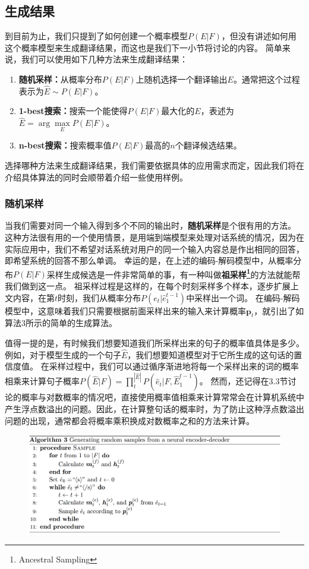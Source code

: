 \documentclass[10pt,a4paper]{ctexart}
\begin{document}
\subsection{生成结果}
到目前为止，我们只提到了如何创建一个概率模型$P(E|F)$，但没有讲述如何用这个概率模型来生成翻译结果，而这也是我们下一小节将讨论的内容。
简单来说，我们可以使用如下几种方法来生成翻译结果：
\begin{enumerate}
\item[] \textbf{随机采样：}从概率分布$P(E|F)$上随机选择一个翻译输出$E$。通常把这个过程表示为$\hat{E} \sim P(E|F)$。
\item[] \textbf{1-best搜索：}搜索一个能使得$P(E|F)$最大化的$E$，表述为$\hat{E} = \arg\max \limits_{E} P(E|F)$。
\item[] \textbf{n-best搜索：}搜索概率值$P(E|F)$最高的$n$个翻译候选结果。
\end{enumerate}
选择哪种方法来生成翻译结果，我们需要依据具体的应用需求而定，因此我们将在介绍具体算法的同时会顺带着介绍一些使用样例。

\subsubsection{随机采样}
当我们需要对同一个输入得到多个不同的输出时，\textbf{随机采样}是个很有用的方法。
这种方法很有用的一个使用情景，是用端到端模型来处理对话系统的情况，因为在实际应用中，我们不希望对话系统对用户的同一个输入内容总是作出相同的回答，即希望系统的回答不那么单调。
幸运的是，在上述的编码-解码模型中，从概率分布$P(E|F)$采样生成候选是一件非常简单的事，有一种叫做\textbf{祖采样\footnote{Ancestral Sampling}}的方法就能帮我们做到这一点。
祖采样过程是这样的，在每个时刻采样多个样本，逐步扩展上文内容，在第$t$时刻，我们从概率分布$P(e_t | \hat{e}_1^{t-1})$中采样出一个词。
在编码-解码模型中，这意味着我们只需要根据前面采样出来的输入来计算概率$\textbf{p}_t$，就引出了如算法3所示的简单的生成算法。

值得一提的是，有时候我们想要知道我们所采样出来的句子的概率值具体是多少。
例如，对于模型生成的一个句子$\hat{E}$，我们想要知道模型对于它所生成的这句话的置信度值。
在采样过程中，我们可以通过循序渐进地将每一个采样出来的词的概率相乘来计算句子概率$P(\hat{E}|F) = \prod_{t}^{|\hat{E}|}P(\hat{e}_t|F,\hat{E}_1^{t-1})$。
然而，还记得在3.3节讨论的概率与对数概率的情况吧，直接使用概率值相乘来计算常常会在计算机系统中产生浮点数溢出的问题。因此，在计算整句话的概率时，为了防止这种浮点数溢出问题的出现，通常都会将概率乘积换成对数概率之和的方法来计算。

\begin{figure}[H]
\centering
\includegraphics[width=1\textwidth]{alg3.png}
\end{figure}
\end{document}
